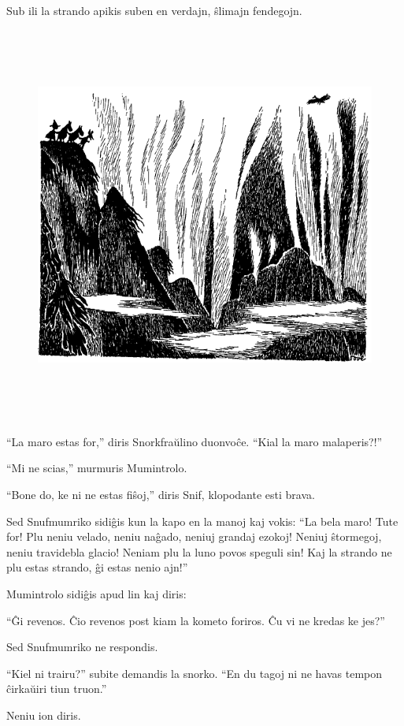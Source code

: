 Sub ili la strando apikis suben en verdajn, ŝlimajn fendegojn.

\begin{figure}[htbp]
\centering
\includegraphics[width=448pt,height=371pt]{7-2.png}
\caption{}
\label{7-2}
\end{figure}

``La maro estas for,'' diris Snorkfraŭlino duonvoĉe. ``Kial la maro malaperis?!''

``Mi ne scias,'' murmuris Mumintrolo.

``Bone do, ke ni ne estas fiŝoj,'' diris Snif, klopodante esti brava.

Sed Snufmumriko sidiĝis kun la kapo en la manoj kaj vokis: ``La bela maro! Tute for! Plu neniu velado, neniu naĝado, neniuj grandaj ezokoj! Neniuj ŝtormegoj, neniu travidebla glacio! Neniam plu la luno povos speguli sin! Kaj la strando ne plu estas strando, ĝi estas nenio ajn!''

Mumintrolo sidiĝis apud lin kaj diris:

``Ĝi revenos. Ĉio revenos post kiam la kometo foriros. Ĉu vi ne kredas ke jes?''

Sed Snufmumriko ne respondis.

``Kiel ni trairu?'' subite demandis la snorko. ``En du tagoj ni ne havas tempon ĉirkaŭiri tiun truon.''

Neniu ion diris.

